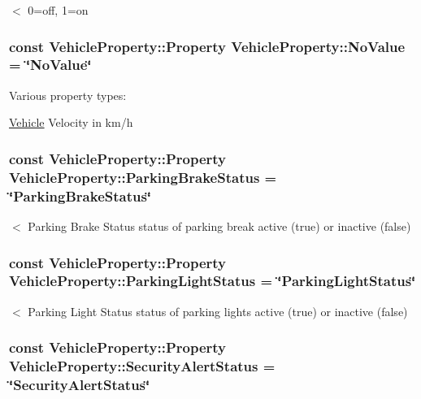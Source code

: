$<$ 0=off, 1=on \hypertarget{classVehicleProperty_ae013e9c1f3fb57d646211d3e6bb4ca9e}{
\subsubsection[{No\-Value}]{\setlength{\rightskip}{0pt plus 5cm}const Vehicle\-Property\-::\-Property Vehicle\-Property\-::\-No\-Value = \char`\"{}No\-Value\char`\"{}\hspace{0.3cm}{\ttfamily [static]}}}\label{classVehicleProperty_ae013e9c1f3fb57d646211d3e6bb4ca9e}


Various property types\-: 

\hyperlink{namespaceVehicle}{Vehicle} Velocity in km/h \hypertarget{classVehicleProperty_a848ad7334c7aa14709fe2e8c3a1b2608}{
\subsubsection[{Parking\-Brake\-Status}]{\setlength{\rightskip}{0pt plus 5cm}const Vehicle\-Property\-::\-Property Vehicle\-Property\-::\-Parking\-Brake\-Status = \char`\"{}Parking\-Brake\-Status\char`\"{}\hspace{0.3cm}{\ttfamily [static]}}}\label{classVehicleProperty_a848ad7334c7aa14709fe2e8c3a1b2608}
$<$ Parking Brake Status status of parking break active (true) or inactive (false) \hypertarget{classVehicleProperty_a505ffc37974f674df55a97c27a7ba0b7}{
\subsubsection[{Parking\-Light\-Status}]{\setlength{\rightskip}{0pt plus 5cm}const Vehicle\-Property\-::\-Property Vehicle\-Property\-::\-Parking\-Light\-Status = \char`\"{}Parking\-Light\-Status\char`\"{}\hspace{0.3cm}{\ttfamily [static]}}}\label{classVehicleProperty_a505ffc37974f674df55a97c27a7ba0b7}
$<$ Parking Light Status status of parking lights active (true) or inactive (false) \hypertarget{classVehicleProperty_a7bc28af663879a2ac9145e5b97a5da4f}{
\subsubsection[{Security\-Alert\-Status}]{\setlength{\rightskip}{0pt plus 5cm}const Vehicle\-Property\-::\-Property Vehicle\-Property\-::\-Security\-Alert\-Status = \char`\"{}Security\-Alert\-Status\char`\"{}\hspace{0.3cm}{\ttfamily [static]}}}\label{classVehicleProperty_a7bc28af663879a2ac9145e5b97a5da4f}

